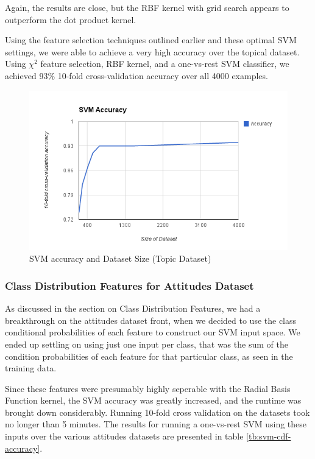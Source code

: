 \documentclass[fontsize=10pt,twocolumn,letterpaper,abstracton]{scrartcl}
\begin{document}
Again, the results are close, but the RBF kernel with grid search appears to outperform the dot product kernel.

Using the feature selection techniques outlined earlier and these optimal SVM settings, we were able to achieve a very high accuracy over the topical dataset.  Using $\chi^{2}$ feature selection, RBF kernel, and a one-vs-rest SVM classifier, we achieved 93\% 10-fold cross-validation accuracy over all 4000 examples.  

\begin{figure}[H]
\centering
    \includegraphics[scale=0.45]{svm_accuracy.png}
  \caption{SVM accuracy and Dataset Size (Topic Dataset)}
  \label{fig:svm_acc}
\end{figure}

\subsubsection{Class Distribution Features for Attitudes Dataset}

As discussed in the section on Class Distribution Features, we had a breakthrough on the attitudes dataset front, when we decided to use the class conditional probabilities of each feature to construct our SVM input space. We ended up settling on using just one input per class, that was the sum of the condition probabilities of each feature for that particular class, as seen in the training data.

Since these features were presumably highly seperable with the Radial Basis Function kernel, the SVM accuracy was greatly increased, and the runtime was brought down considerably. Running 10-fold cross validation on the datasets took no longer than 5 minutes. The results for running a one-vs-rest SVM using these inputs over the various attitudes datasets are presented in table \ref{tb:svm-cdf-accuracy}.
\end{document}
